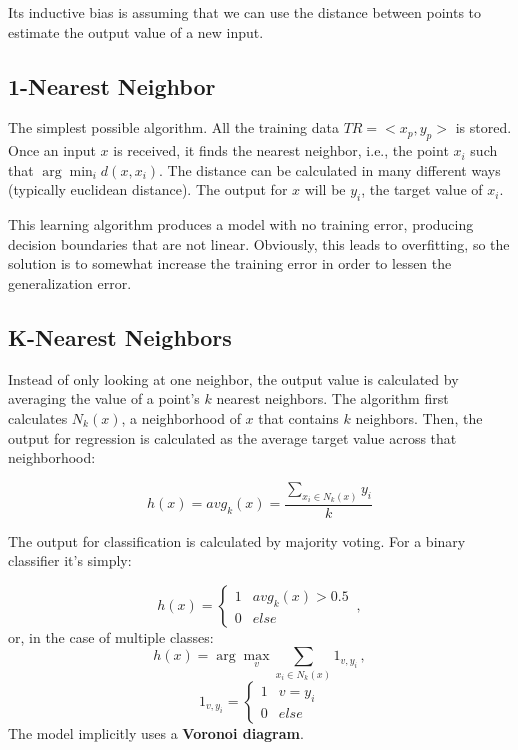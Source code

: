 Its inductive bias is assuming that we can use the distance between points to estimate the output value of a new input.

\subsection{1-Nearest Neighbor}

The simplest possible algorithm. All the training data $TR = <x_p, y_p>$ is stored. Once an input $x$ is received, it finds the nearest neighbor, i.e., the point $x_i$ such that $\arg \min_i d(x, x_i)$. The distance can be calculated in many different ways (typically euclidean distance). The output for $x$ will be $y_i$, the target value of $x_i$.

This learning algorithm produces a model with no training error, producing decision boundaries that are not linear. Obviously, this leads to overfitting, so the solution is to somewhat increase the training error in order to lessen the generalization error.

\subsection{K-Nearest Neighbors}

Instead of only looking at one neighbor, the output value is calculated by averaging the value of a point's $k$ nearest neighbors. The algorithm first calculates $N_k(x)$, a neighborhood of $x$ that contains $k$ neighbors. Then, the output for regression is calculated as the average target value across that neighborhood:

\begin{equation*}
    h(x) = avg_k(x) = \frac{\sum_{x_i \in N_k(x)} y_i}{k}
\end{equation*}

The output for classification is calculated by majority voting. For a binary classifier it's simply:

\begin{equation*}
    h(x) = \begin{cases}
        1 & avg_k(x) > 0.5 \\
        0 & else
    \end{cases} \, ,
\end{equation*}
or, in the case of multiple classes:
\begin{equation*}
    h(x) = \arg \max_v \sum_{x_i \in N_k(x)} 1_{v,y_i} \, ,
\end{equation*}
\begin{equation*}
    1_{v,y_i} = \begin{cases}
        1 & v = y_i \\
        0 & else
    \end{cases}
\end{equation*}
The model implicitly uses a \textbf{Voronoi diagram}.

